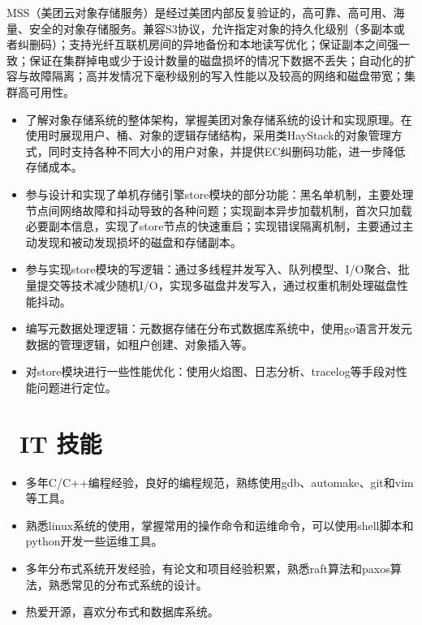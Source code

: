 \documentclass{resume}
\begin{document}
MSS（美团云对象存储服务）是经过美团内部反复验证的，高可靠、高可用、海量、安全的对象存储服务。兼容S3协议，允许指定对象的持久化级别（多副本或者纠删码）；支持光纤互联机房间的异地备份和本地读写优化；保证副本之间强一致；保证在集群掉电或少于设计数量的磁盘损坏的情况下数据不丢失；自动化的扩容与故障隔离；高并发情况下毫秒级别的写入性能以及较高的网络和磁盘带宽；集群高可用性。
\begin{itemize}
  \item 了解对象存储系统的整体架构，掌握美团对象存储系统的设计和实现原理。在使用时展现用户、桶、对象的逻辑存储结构，采用类HayStack的对象管理方式，同时支持各种不同大小的用户对象，并提供EC纠删码功能，进一步降低存储成本。
  \item 参与设计和实现了单机存储引擎store模块的部分功能：黑名单机制，主要处理节点间网络故障和抖动导致的各种问题；实现副本异步加载机制，首次只加载必要副本信息，实现了store节点的快速重启；实现错误隔离机制，主要通过主动发现和被动发现损坏的磁盘和存储副本。
  \item 参与实现store模块的写逻辑：通过多线程并发写入、队列模型、I/O聚合、批量提交等技术减少随机I/O，实现多磁盘并发写入，通过权重机制处理磁盘性能抖动。
  \item 编写元数据处理逻辑：元数据存储在分布式数据库系统中，使用go语言开发元数据的管理逻辑，如租户创建、对象插入等。
  \item 对store模块进行一些性能优化：使用火焰图、日志分析、tracelog等手段对性能问题进行定位。
\end{itemize}


\section{\faCogs\ IT 技能}
\begin{itemize}[parsep=0.5ex]
  \item 多年C/C++编程经验，良好的编程规范，熟练使用gdb、automake、git和vim等工具。
  \item 熟悉linux系统的使用，掌握常用的操作命令和运维命令，可以使用shell脚本和python开发一些运维工具。
  \item 多年分布式系统开发经验，有论文和项目经验积累，熟悉raft算法和paxos算法，熟悉常见的分布式系统的设计。
  \item 热爱开源，喜欢分布式和数据库系统。
\end{itemize}
\end{document}
